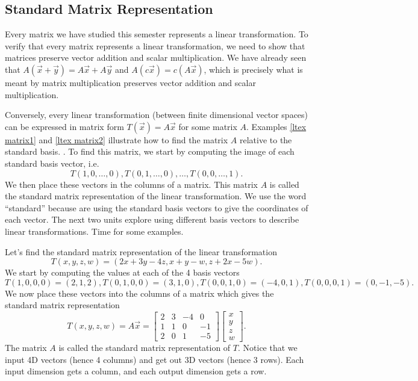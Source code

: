 \subsection{Standard Matrix Representation}
Every matrix we have studied this semester represents a linear transformation. 
To verify that every matrix represents a linear transformation, we need to show that matrices preserve vector addition and scalar multiplication. We have already seen that $A(\vec x+\vec y) = A\vec x+A\vec y$ and $A(c\vec x)=c(A\vec x)$, which is precisely what is meant by matrix multiplication preserves vector addition and scalar multiplication.  

Conversely, every linear transformation (between finite dimensional vector spaces) can be expressed in matrix form $T(\vec x)=A\vec x$ for some matrix $A$.
Examples \ref{ltex matrix1} and \ref{ltex matrix2} illustrate how to find the matrix $A$ relative to the standard basis. . 
To find this matrix, we start by computing the image of each standard basis vector, i.e. $$T(1,0,\ldots,0),T(0,1,\ldots,0), \ldots,T(0,0,\ldots,1).$$ We then place these vectors in the columns of a matrix.  This matrix $A$ is called the standard matrix representation of the linear transformation. We use the word ``standard'' because are using the standard basis vectors to give the coordinates of each vector.  The next two units explore using different basis vectors to describe linear transformations. Time for some examples.

\begin{example}
Let's find the standard matrix representation of the linear transformation $$T(x,y,z,w)=(2x+3y-4z,x+y-w,z+2x-5w).$$ We start by computing the values at each of the 4 basis vectors  $$T(1,0,0,0)=(2,1,2),T(0,1,0,0)=(3,1,0),T(0,0,1,0)=(-4,0,1),T(0,0,0,1)=(0,-1,-5).$$ 
We now place these vectors into the columns of a matrix which gives the standard matrix representation
$$T(x,y,z,w)=A\vec x=
\begin{bmatrix}
2&3&-4&0\\
1&1&0 &-1\\
2&0&1 &-5
\end{bmatrix}
\begin{bmatrix}
x\\
y\\
z\\
w
\end{bmatrix}.$$ 
The matrix $A$ is called the standard matrix representation of $T$. 
Notice that we input 4D vectors (hence 4 columns) and get out 3D vectors (hence 3 rows).  
Each input dimension gets a column, and each output dimension gets a row.   
\end{example}

